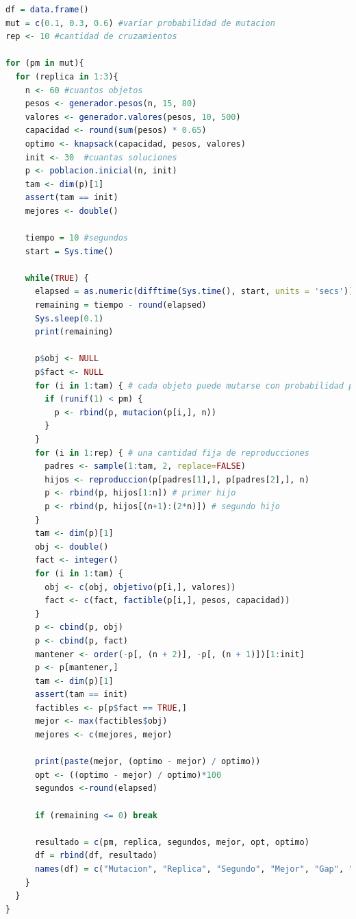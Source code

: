 \documentclass{article}
\begin{document}
\lstset{style=mystyle}
\begin{lstlisting}[language=R, caption= Fragemento del código para variar la probabilidad de mutación en tres niveles.]
df = data.frame()
mut = c(0.1, 0.3, 0.6) #variar probabilidad de mutacion
rep <- 10 #cantidad de cruzamientos

for (pm in mut){
  for (replica in 1:3){
    n <- 60 #cuantos objetos
    pesos <- generador.pesos(n, 15, 80)
    valores <- generador.valores(pesos, 10, 500)
    capacidad <- round(sum(pesos) * 0.65)
    optimo <- knapsack(capacidad, pesos, valores)
    init <- 30  #cuantas soluciones
    p <- poblacion.inicial(n, init)
    tam <- dim(p)[1]
    assert(tam == init)
    mejores <- double()
    
    tiempo = 10 #segundos
    start = Sys.time()
    
    while(TRUE) {
      elapsed = as.numeric(difftime(Sys.time(), start, units = 'secs'))
      remaining = tiempo - round(elapsed) 
      Sys.sleep(0.1)
      print(remaining)
      
      p$obj <- NULL
      p$fact <- NULL
      for (i in 1:tam) { # cada objeto puede mutarse con probabilidad pm
        if (runif(1) < pm) {
          p <- rbind(p, mutacion(p[i,], n))
        }
      }
      for (i in 1:rep) { # una cantidad fija de reproducciones
        padres <- sample(1:tam, 2, replace=FALSE)
        hijos <- reproduccion(p[padres[1],], p[padres[2],], n)
        p <- rbind(p, hijos[1:n]) # primer hijo
        p <- rbind(p, hijos[(n+1):(2*n)]) # segundo hijo
      }
      tam <- dim(p)[1]
      obj <- double()
      fact <- integer()
      for (i in 1:tam) {
        obj <- c(obj, objetivo(p[i,], valores))
        fact <- c(fact, factible(p[i,], pesos, capacidad))
      }
      p <- cbind(p, obj)
      p <- cbind(p, fact)
      mantener <- order(-p[, (n + 2)], -p[, (n + 1)])[1:init]
      p <- p[mantener,]
      tam <- dim(p)[1]
      assert(tam == init)
      factibles <- p[p$fact == TRUE,]
      mejor <- max(factibles$obj)
      mejores <- c(mejores, mejor)
      
      print(paste(mejor, (optimo - mejor) / optimo))
      opt <- ((optimo - mejor) / optimo)*100
      segundos <-round(elapsed)
      
      if (remaining <= 0) break
      
      resultado = c(pm, replica, segundos, mejor, opt, optimo)
      df = rbind(df, resultado)
      names(df) = c("Mutacion", "Replica", "Segundo", "Mejor", "Gap", "Optimo")
    }
  }
}
\end{lstlisting}
\end{document}
